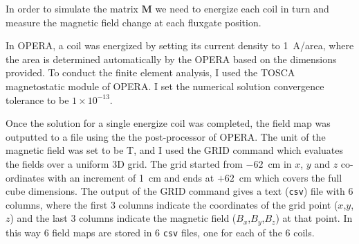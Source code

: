 In order to simulate the matrix $\bm{M}$ we need to energize each
coil in turn and measure the magnetic field change at each fluxgate
position.

In OPERA, a coil was energized by setting its current density to
1~A/area, where the area is determined automatically by the OPERA
based on the dimensions provided.  To conduct the finite element
analysis, I used the TOSCA magnetostatic module of OPERA.  I set the
numerical solution convergence tolerance to be $1\times10^{-13}$.

Once the solution for a single energize coil was completed, the field
map was outputted to a file using the the post-processor of OPERA.
The unit of the magnetic field was set to be T, and I used the GRID
command which evaluates the fields over a uniform 3D grid. The grid
started from $-62$~cm in $x$, $y$ and $z$ co-ordinates with an
increment of 1~cm and ends at $+62$~cm which covers the full cube
dimensions.  The output of the GRID command gives a text ({\tt csv})
file with 6 columns, where the first 3 columns indicate the
coordinates of the grid point ($x$,$y$,$z$) and the last 3 columns
indicate the magnetic field ($B_x$,$B_y$,$B_z$) at that point.  In
this way 6 field maps are stored in 6 {\tt csv} files, one for each of
the 6 coils.





